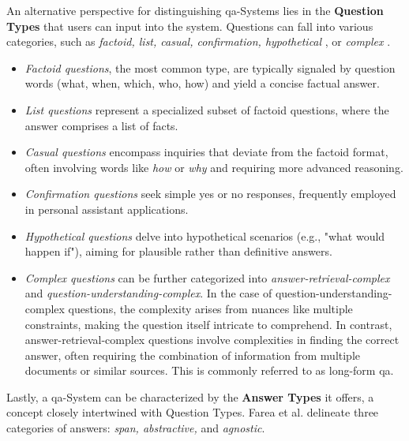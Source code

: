 An alternative perspective for distinguishing \gls{qa}-Systems lies in the \textbf{Question Types} that users can input into the system. Questions can fall into various categories, such as \textit{factoid, list, casual, confirmation, hypothetical} \cite{mishra_survey_2016}, or \textit{complex} \cite{etezadi_state_2023}.

\begin{itemize}
   \item \textit{Factoid questions}, the most common type, are typically signaled by question words (what, when, which, who, how) and yield a concise factual answer.
   
   \item \textit{List questions} represent a specialized subset of factoid questions, where the answer comprises a list of facts.
   
   \item \textit{Casual questions} encompass inquiries that deviate from the factoid format, often involving words like \textit{how} or \textit{why} and requiring more advanced reasoning.
   
   \item \textit{Confirmation questions} seek simple yes or no responses, frequently employed in personal assistant applications.
   
   \item \textit{Hypothetical questions} delve into hypothetical scenarios (e.g., "what would happen if"), aiming for plausible rather than definitive answers.
   
   \item \textit{Complex questions} can be further categorized into \textit{answer-retrieval-complex} and \textit{question-understanding-complex}. In the case of question-understanding-complex questions, the complexity arises from nuances like multiple constraints, making the question itself intricate to comprehend. In contrast, answer-retrieval-complex questions involve complexities in finding the correct answer, often requiring the combination of information from multiple documents or similar sources. This is commonly referred to as long-form \gls{qa}.
\end{itemize}

Lastly, a \gls{qa}-System can be characterized by the \textbf{Answer Types} it offers, a concept closely intertwined with Question Types. Farea et al. \cite{farea_evaluation_2022} delineate three categories of answers: \textit{span, abstractive,} and \textit{agnostic}. 

